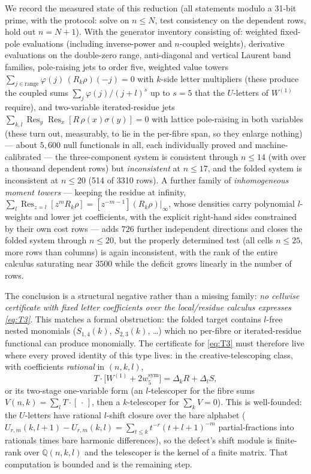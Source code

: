 \documentclass[11pt]{article}
\theoremstyle{remark}
\newcommand{\QQ}{\mathbb Q}
\DeclareMathOperator{\Res}{Res}
\begin{document}
We record the measured state of this reduction (all statements modulo a
31-bit prime, with the protocol: solve on $n\le N$, test consistency on the
dependent rows, hold out $n=N{+}1$).  With the generator inventory
consisting of: weighted fixed-pole evaluations (including inverse-power and
$n$-coupled weights), derivative evaluations on the double-zero range,
anti-diagonal and vertical Laurent band families, pole-raising jets to
order five, weighted value towers
$\sum_{j\in\mathrm{range}}\varphi(j)\,(R_k\rho)(-j)=0$ with $k$-side letter
multipliers (these produce the coupled sums $\sum_j\varphi(j)/(j+l)^s$ up
to $s=5$ that the $U$-letters of $W^{(1)}$ require), and two-variable
iterated-residue jets $\sum_{k,l}\Res_y\Res_x[R\,\rho(x)\sigma(y)]=0$ with
lattice pole-raising in both variables (these turn out, measurably, to lie
in the per-fibre span, so they enlarge nothing) ---
about $5{,}600$ null functionals in all, each individually proved and
machine-calibrated --- the three-component system is consistent through
$n\le14$ (with over a thousand dependent rows) but \emph{inconsistent} at
$n\le17$, and the folded system is inconsistent at $n\le20$ (514 of 3310
rows).  A further family of \emph{inhomogeneous moment towers} --- keeping
the residue at infinity,
$\sum_{l}\Res_{z=l}[z^mR_k\rho]=[z^{-m-1}](R_k\rho)\big|_\infty$, whose
densities carry polynomial $l$-weights and lower jet coefficients, with the
explicit right-hand sides constrained by their own cost rows --- adds
$726$ further independent directions and closes the folded system through
$n\le20$, but the properly determined test (all cells $n\le25$, more rows
than columns) is again inconsistent, with the rank of the entire calculus
saturating near $3500$ while the deficit grows linearly in the number of
rows.

The conclusion is a structural negative rather than a missing family:
\emph{no cellwise certificate with fixed letter coefficients over the
local/residue calculus expresses \eqref{eq:T3}}.  This matches a formal
obstruction: the folded target contains $l$-free nested monomials
($S_{1,4}(k)$, $S_{2,3}(k)$, \dots) which no per-fibre or iterated-residue
functional can produce monomially.  The certificate for \eqref{eq:T3} must
therefore live where every proved identity of this type lives: in the
creative-telescoping class, with coefficients \emph{rational} in $(n,k,l)$,
\[
 T\cdot\bigl[W^{(1)}+2w_5^{\mathrm{sym}}\bigr]
 =\Delta_k R+\Delta_l S,
\]
or its two-stage one-variable form (an $l$-telescoper for the fibre sums
$V(n,k)=\sum_lT\cdot[\,\cdot\,]$, then a $k$-telescoper for $\sum_kV=0$).
This is well-founded: the $U$-letters have rational $l$-shift closure over
the bare alphabet
($U_{r,m}(k,l{+}1)-U_{r,m}(k,l)=\sum_{t\le k}t^{-r}(t{+}l{+}1)^{-m}$
partial-fractions into rationals times bare harmonic differences), so the
defect's shift module is finite-rank over $\QQ(n,k,l)$ and the telescoper
is the kernel of a finite matrix.  That computation is bounded and is the
remaining step.
\end{document}
